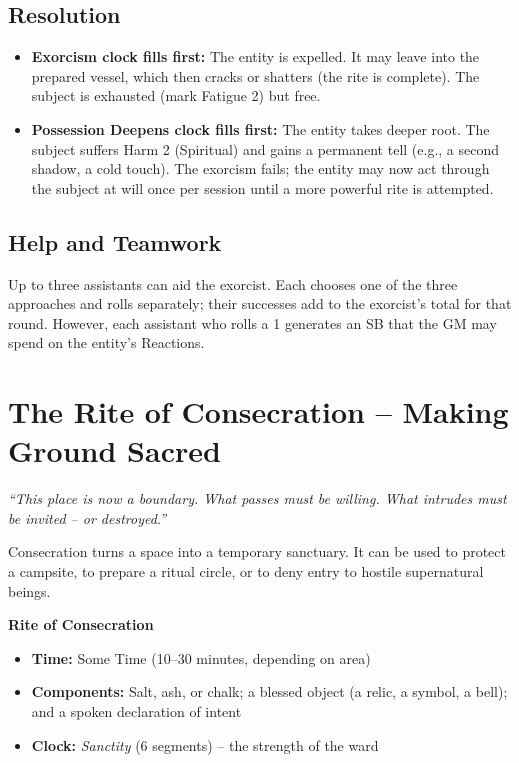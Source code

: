 \documentclass[10pt,a5paper]{book}
\begin{document}
\subsection*{Resolution}

\begin{itemize}
    \item \textbf{Exorcism clock fills first:} The entity is expelled. It may leave into the prepared vessel, which then cracks or shatters (the rite is complete). The subject is exhausted (mark Fatigue 2) but free.
    \item \textbf{Possession Deepens clock fills first:} The entity takes deeper root. The subject suffers Harm 2 (Spiritual) and gains a permanent tell (e.g., a second shadow, a cold touch). The exorcism fails; the entity may now act through the subject at will once per session until a more powerful rite is attempted.
\end{itemize}

\subsection*{Help and Teamwork}

Up to three assistants can aid the exorcist. Each chooses one of the three approaches and rolls separately; their successes add to the exorcist’s total for that round. However, each assistant who rolls a 1 generates an SB that the GM may spend on the entity’s Reactions.

\clearpage

\section{The Rite of Consecration – Making Ground Sacred}

\textit{“This place is now a boundary. What passes must be willing. What intrudes must be invited – or destroyed.”}

Consecration turns a space into a temporary sanctuary. It can be used to protect a campsite, to prepare a ritual circle, or to deny entry to hostile supernatural beings.

\begin{tcolorbox}[colback=blue!5, colframe=blue!70]
\textbf{Rite of Consecration}
\begin{itemize}
    \item \textbf{Time:} Some Time (10–30 minutes, depending on area)
    \item \textbf{Components:} Salt, ash, or chalk; a blessed object (a relic, a symbol, a bell); and a spoken declaration of intent
    \item \textbf{Clock:} \textit{Sanctity} (6 segments) – the strength of the ward
\end{itemize}
\end{tcolorbox}
\end{document}
